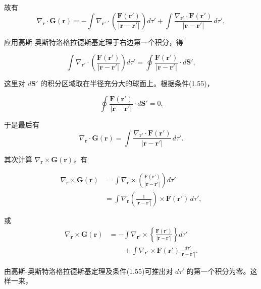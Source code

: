 \documentclass[11pt,a4paper,oneside]{ctexbook}
\newcommand{\ve}[1]{\bm{#1}}
\begin{document}
故有
\begin{equation*}
\nabla_{\ve{r}} \cdot \ve{G}(\ve{r}) = -\int \nabla_{\ve{r}'} \cdot \left(\frac{\ve{F}(\ve{r}')}{|\ve{r} - \ve{r}'|}\right) d\tau' + \int \frac{\nabla_{\ve{r}'} \cdot \ve{F}(\ve{r}')}{|\ve{r} - \ve{r}'|}\, d\tau',
\end{equation*}

应用高斯-奥斯特洛格拉德斯基定理于右边第一个积分，得

\begin{equation*}
\int \nabla_{\ve{r}'} \cdot \left(\frac{\ve{F}(\ve{r}')}{|\ve{r} - \ve{r}'|}\right) d\tau' = \oint \frac{\ve{F}(\ve{r}')}{|\ve{r} - \ve{r}'|} \cdot d\ve{S}',
\end{equation*}

这里对 $d\ve{S}'$ 的积分区域取在半径充分大的球面上。根据条件(1.55)，

\begin{equation*}
\oint \frac{\ve{F}(\ve{r}')}{|\ve{r} - \ve{r}'|} \cdot d\ve{S}' = 0.
\end{equation*}

于是最后有
\begin{equation*}
\nabla_{\ve{r}} \cdot \ve{G}(\ve{r}) = \int \frac{\nabla_{\ve{r}'} \cdot \ve{F}(\ve{r}')}{|\ve{r} - \ve{r}'|}\, d\tau'.
\end{equation*}

其次计算 $\nabla_{\ve{r}} \times \ve{G}(\ve{r})$，有

\begin{equation*}
\begin{aligned}
\nabla_{\ve{r}} \times \ve{G}(\ve{r}) &= \int \nabla_{\ve{r}} \times \left(\frac{\ve{F}(\ve{r}')}{|\ve{r} - \ve{r}'|}\right) d\tau'\\
&= \int \nabla_{\ve{r}} \left(\frac{1}{|\ve{r} - \ve{r}'|}\right) \times \ve{F}(\ve{r}')\, d\tau',
\end{aligned}
\end{equation*}

或
\begin{equation*}
\begin{aligned}
\nabla_{\ve{r}} \times \ve{G}(\ve{r}) &= -\int \nabla_{\ve{r}'} \times \left\{\frac{\ve{F}(\ve{r}')}{|\ve{r} - \ve{r}'|}\right\} d\tau'\\
&\qquad + \int \nabla_{\ve{r}'} \times \ve{F}(\ve{r}') \frac{d\tau'}{|\ve{r} - \ve{r}'|}.
\end{aligned}
\end{equation*}

由高斯-奥斯特洛格拉德斯基定理及条件(1.55)可推出对 $d\tau'$ 的第一个积分为零。这样一来，
\end{document}
